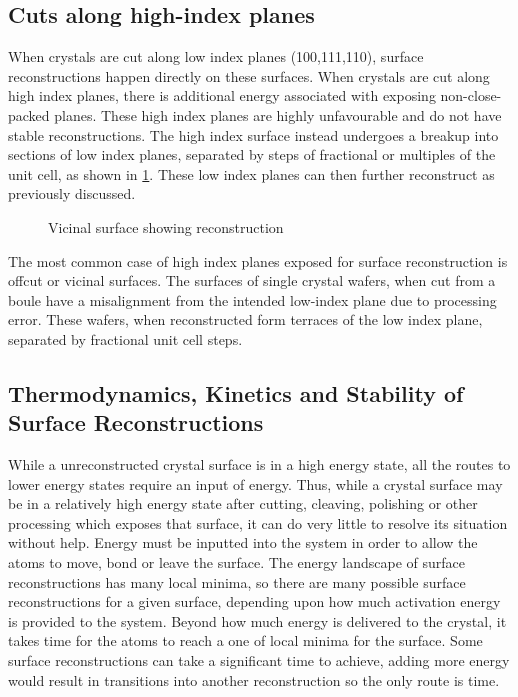 \subsection{Cuts along high-index planes}
When crystals are cut along low index planes (100,111,110), surface reconstructions happen directly on these surfaces. When crystals are cut along high index planes, there is additional energy associated with exposing non-close-packed planes. These high index planes are highly unfavourable and do not have stable reconstructions. The high index surface instead undergoes a breakup into sections of low index planes, separated by steps of fractional or multiples of the unit cell, as shown in \cref{fig:back_recon_vicinal}. These low index planes can then further reconstruct as previously discussed.
\begin{figure}
    \centering
    \caption{\label{fig:back_recon_vicinal}Vicinal surface showing reconstruction}
\end{figure}

The most common case of high index planes exposed for surface reconstruction is offcut or vicinal surfaces. The surfaces of single crystal wafers, when cut from a boule have a misalignment from the intended low-index plane due to processing error. These wafers, when reconstructed form terraces of the low index plane, separated by fractional unit cell steps.

\subsection{Thermodynamics, Kinetics and Stability of Surface Reconstructions}
While a unreconstructed crystal surface is in a high energy state, all the routes to lower energy states require an input of energy. Thus, while a crystal surface may be in a relatively high energy state after cutting, cleaving, polishing or other processing which exposes that surface, it can do very little to resolve its situation without help. Energy must be inputted into the system in order to allow the atoms to move, bond or leave the surface. The energy landscape of surface reconstructions has many local minima, so there are many possible surface reconstructions for a given surface, depending upon how much activation energy is provided to the system. Beyond how much energy is delivered to the crystal, it takes time for the atoms to reach a one of local minima for the surface. Some surface reconstructions can take a significant time to achieve, adding more energy would result in transitions into another reconstruction so the only route is time.

